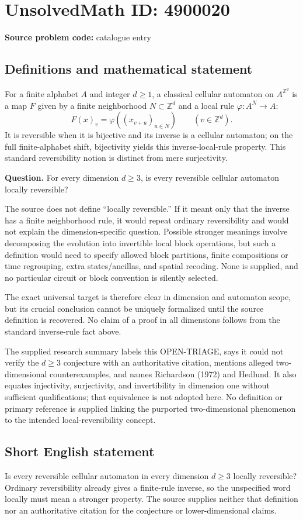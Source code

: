 \documentclass[11pt]{article}
\newcommand{\Z}{\mathbb{Z}}
\begin{document}
\section*{UnsolvedMath ID: 4900020}
\textbf{Source problem code:} catalogue entry
\subsection{Definitions and mathematical statement}
For a finite alphabet $A$ and integer $d\geq1$, a classical cellular automaton on $A^{\Z^d}$ is a map $F$ given by a finite neighborhood $N\subset\Z^d$ and a local rule $\varphi:A^N\to A$:
\[
 F(x)_v=\varphi((x_{v+u})_{u\in N})\qquad(v\in\Z^d).
\]
It is reversible when it is bijective and its inverse is a cellular automaton; on the full finite-alphabet shift, bijectivity yields this inverse-local-rule property. This standard reversibility notion is distinct from mere surjectivity.

\textbf{Question.} For every dimension $d\geq3$, is every reversible cellular automaton locally reversible?

The source does not define ``locally reversible.'' If it meant only that the inverse has a finite neighborhood rule, it would repeat ordinary reversibility and would not explain the dimension-specific question. Possible stronger meanings involve decomposing the evolution into invertible local block operations, but such a definition would need to specify allowed block partitions, finite compositions or time regrouping, extra states/ancillas, and spatial recoding. None is supplied, and no particular circuit or block convention is silently selected.

The exact universal target is therefore clear in dimension and automaton scope, but its crucial conclusion cannot be uniquely formalized until the source definition is recovered. No claim of a proof in all dimensions follows from the standard inverse-rule fact above.

The supplied research summary labels this OPEN-TRIAGE, says it could not verify the $d\geq3$ conjecture with an authoritative citation, mentions alleged two-dimensional counterexamples, and names Richardson (1972) and Hedlund. It also equates injectivity, surjectivity, and invertibility in dimension one without sufficient qualifications; that equivalence is not adopted here. No definition or primary reference is supplied linking the purported two-dimensional phenomenon to the intended local-reversibility concept.
\subsection{Short English statement}
Is every reversible cellular automaton in every dimension $d\geq3$ locally reversible? Ordinary reversibility already gives a finite-rule inverse, so the unspecified word locally must mean a stronger property. The source supplies neither that definition nor an authoritative citation for the conjecture or lower-dimensional claims.
\end{document}
